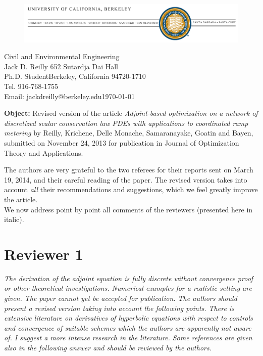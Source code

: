 \documentclass[10pt]{article}
\begin{document}
%
\begin{figure}
\includegraphics[width=1\columnwidth]{berkeley-letterhead.jpg}
\end{figure}



\hfill{}Civil and Environmental Engineering \\
Jack D. Reilly \hfill{}652 Sutardja Dai Hall \\
Ph.D. Student\hfill{}\hfill{}Berkeley, California 94720-1710\\
Tel. 916-768-1755 \\
Email: jackdreilly@berkeley.edu\hfill{}\today

\bigskip{}


\bigskip{}
\textbf{Object:} Revised version of the article \textit{Adjoint-based optimization on a network of discretized scalar conservation law PDEs with applications to coordinated ramp metering}
 by Reilly, Krichene, Delle Monache, Samaranayake, Goatin and Bayen, submitted on November 24, 2013 for publication in Journal of Optimization Theory and Applications.

\bigskip{}


\bigskip{}


The authors are very grateful to the two referees for their
reports sent on March 19, 2014, and their careful reading of the
paper. The revised version takes into account \emph{all} their recommendations
and suggestions, which we feel greatly improve the article.\\

We now address point by point all comments of the reviewers (presented
here in italic).

\section{Reviewer 1}

\emph{The derivation of the adjoint equation is fully discrete without convergence proof
or other theoretical investigations. Numerical examples for a realistic setting
are given. The paper cannot yet be accepted for publication. The authors should present
a revised version taking into account the following points. There is extensive literature on derivatives of hyperbolic equations with respect to controls and convergence of suitable schemes which the authors are apparently
not aware of. I suggest a more intense research in the literature. Some references
are given also in the following answer and should be reviewed by the authors.}\\
\end{document}
